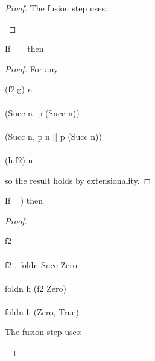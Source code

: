\documentclass{seminar}
\newcommand{\NAT}{\textcolor{MathColor}{\ensuremath{\mathbb{N}}}}
\begin{document}
\begin{slide}
\begin{proof}
The fusion step uses:
\begin{code}
\end{code}
\end{proof}


\newpage


\begin{lemma} \label{lemma-f}
If ~  ~
then ~
\end{lemma}
\begin{proof} For any ~ \tm{\in\NAT}

\begin{code}
(f2.g) n\\
\\
(Succ n, p (Succ n))\\
\\
(Succ n, p n || p (Succ n))\\
\\
(h.f2) n\\
\end{code}

so the result holds by extensionality.
\end{proof}

\newpage


\begin{lemma} \label{lemma-c}
If ~  ) \tm{\wedge}
\newline
then ~ 
\end{lemma}
\begin{proof}
\begin{code}
f2\\
\\
f2 . foldn Succ Zero\\
\\
foldn h (f2 Zero)\\
\\
foldn h (Zero, True)
\end{code}

The fusion step uses:
\begin{code}
\end{code}
\end{proof}


\end{slide}
\end{document}
